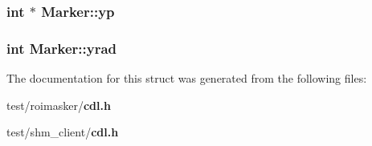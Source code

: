 \subsubsection{\setlength{\rightskip}{0pt plus 5cm}int $\ast$ \bf{Marker::yp}}\label{structMarker_b94b388f48a93946a2dd003216b34851}


\subsubsection{\setlength{\rightskip}{0pt plus 5cm}int \bf{Marker::yrad}}\label{structMarker_50302540fb3101c23e873fda19da7a77}




The documentation for this struct was generated from the following files:\begin{CompactItemize}
\item 
test/roimasker/\bf{cdl.h}\item 
test/shm\_\-client/\bf{cdl.h}\end{CompactItemize}
